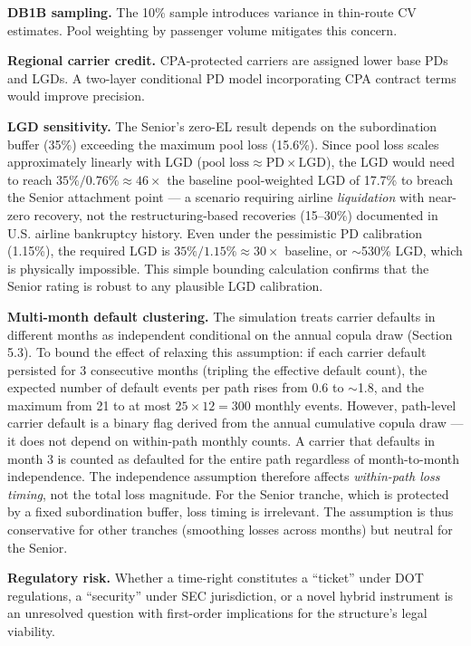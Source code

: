 \documentclass[12pt,a4paper]{article}
\begin{document}
\textbf{DB1B sampling.} The 10\% sample introduces variance in thin-route CV estimates. Pool weighting by passenger volume mitigates this concern.

\textbf{Regional carrier credit.} CPA-protected carriers are assigned lower base PDs and LGDs. A two-layer conditional PD model incorporating CPA contract terms would improve precision.

\textbf{LGD sensitivity.} The Senior's zero-EL result depends on the subordination buffer (35\%) exceeding the maximum pool loss (15.6\%). Since pool loss scales approximately linearly with LGD ($\text{pool loss} \approx \text{PD} \times \text{LGD}$), the LGD would need to reach $35\% / 0.76\% \approx 46\times$ the baseline pool-weighted LGD of 17.7\% to breach the Senior attachment point — a scenario requiring airline \textit{liquidation} with near-zero recovery, not the restructuring-based recoveries (15--30\%) documented in U.S. airline bankruptcy history. Even under the pessimistic PD calibration (1.15\%), the required LGD is $35\% / 1.15\% \approx 30\times$ baseline, or $\sim$530\% LGD, which is physically impossible. This simple bounding calculation confirms that the Senior rating is robust to any plausible LGD calibration.

\textbf{Multi-month default clustering.} The simulation treats carrier defaults in different months as independent conditional on the annual copula draw (Section 5.3). To bound the effect of relaxing this assumption: if each carrier default persisted for 3 consecutive months (tripling the effective default count), the expected number of default events per path rises from 0.6 to $\sim$1.8, and the maximum from 21 to at most $25 \times 12 = 300$ monthly events. However, path-level carrier default is a binary flag derived from the annual cumulative copula draw — it does not depend on within-path monthly counts. A carrier that defaults in month 3 is counted as defaulted for the entire path regardless of month-to-month independence. The independence assumption therefore affects \textit{within-path loss timing}, not the total loss magnitude. For the Senior tranche, which is protected by a fixed subordination buffer, loss timing is irrelevant. The assumption is thus conservative for other tranches (smoothing losses across months) but neutral for the Senior.

\textbf{Regulatory risk.} Whether a time-right constitutes a ``ticket'' under DOT regulations, a ``security'' under SEC jurisdiction, or a novel hybrid instrument is an unresolved question with first-order implications for the structure's legal viability.
\end{document}
